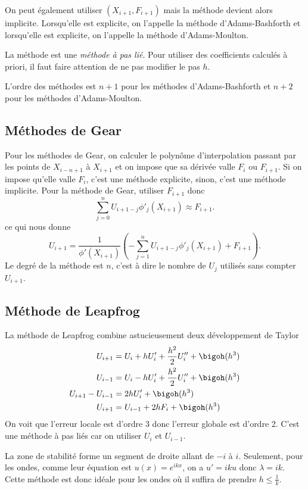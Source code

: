 On peut également utiliser $(X_{i+1}, F_{i+1})$ mais la méthode devient
alors implicite.
Lorsqu'elle est explicite, on l'appelle la méthode
d'Adams-Bashforth et lorsqu'elle est explicite, on l'appelle
la méthode d'Adams-Moulton.

La méthode est une \emph{méthode à pas lié}.
Pour utiliser des coefficients calculés à priori,
il faut faire attention de ne pas modifier le pas $h$.

L'ordre des méthodes est $n+1$ pour les méthodes d'Adams-Bashforth et
$n+2$ pour les méthodes d'Adams-Moulton.

\subsection{Méthodes de Gear}
Pour les méthodes de Gear,
on calculer le polynôme d'interpolation passant par les points de
$X_{i-n+1}$ à $X_{i+1}$ et on impose que sa dérivée valle $F_i$ ou
$F_{i+1}$.
Si on impose qu'elle valle $F_i$, c'est une méthode explicite,
sinon, c'est une méthode implicite.
Pour la méthode de Gear, utiliser $F_{i+1}$ donc
\[ \sum_{j=0}^n U_{i+1-j}\phi'_j(X_{i+1}) \approx F_{i+1}. \]
ce qui nous donne
\[ U_{i+1} = \frac{1}{\phi'(X_{i+1})}
\left(-\sum_{j=1}^n U_{i+1-j}\phi'_j(X_{i+1}) + F_{i+1}\right). \]
Le degré de la méthode est $n$, c'est à dire le nombre de $U_j$ utilisés
sans compter $U_{i+1}$.

\subsection{Méthode de Leapfrog}
La méthode de Leapfrog combine astucieusement deux développement de Taylor
\begin{align*}
  U_{i+1} & = U_i + hU_i' + \frac{h^2}{2}U_i'' + \bigoh(h^3)\\
  U_{i-1} & = U_i - hU_i' + \frac{h^2}{2}U_i'' + \bigoh(h^3)\\
  U_{i+1} - U_{i-1} & = 2hU_i' + \bigoh(h^3)\\
  U_{i+1} & = U_{i-1} + 2hF_i + \bigoh(h^3)
\end{align*}
On voit que l'erreur locale est d'ordre 3 donc l'erreur
globale est d'ordre 2.
C'est une méthode à pas liés car on utiliser $U_i$ et $U_{i-1}$.

La zone de stabilité forme un segment de droite allant de $-i$ à $i$.
Seulement, pour les ondes, comme leur équation
est $u(x) = e^{ikx}$, on a $u' = iku$ donc $\lambda = ik$.
Cette méthode est donc idéale pour les ondes où il suffira de prendre
$h \leq \frac{1}{k}$.

